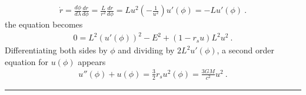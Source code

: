 \documentclass[letterpaper,10pt,english]{jupyterBook}
\begin{document}
\begin{equation*}
\begin{split}\dot{r} = \frac{d \phi}{d \lambda} \frac{d r}{d \phi} = \frac{L}{r^2} \frac{d r}{d \phi} = L u^2 \left( - \frac{1}{u^2} \right) u'(\phi) = - L u'(\phi) \ .\end{split}
\end{equation*}
\sphinxAtStartPar
the equation becomes
\begin{equation*}
\begin{split}0 = L^2 \left( u'(\phi) \right)^2 - E^2 + ( 1 - r_s u ) L^2 u^2 \ .\end{split}
\end{equation*}
\sphinxAtStartPar
Differentiating both sides by \(\phi\) and dividing by \(2 L^2 u'(\phi)\), a second order equation for \(u(\phi)\) appears
\begin{equation*}
\begin{split}u''(\phi) + u(\phi) = \frac{3}{2} r_{s} u^2(\phi) = \frac{3 GM}{c^2} u^2 \ .\end{split}
\end{equation*}

\bigskip\hrule\bigskip
\end{document}
